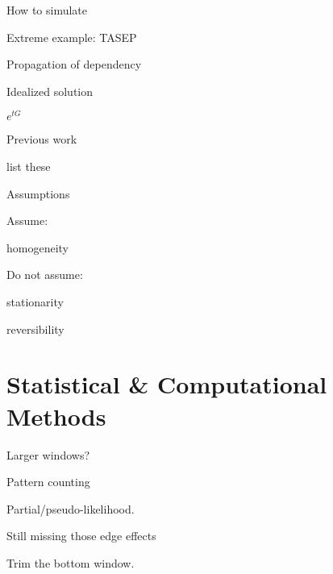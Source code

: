 \documentclass[smaller]{beamer}
\begin{document}
\begin{frame}{How to simulate}

\end{frame}

\begin{frame}{Extreme example: TASEP}



\end{frame}


\begin{frame}{Propagation of dependency}

\end{frame}


\begin{frame}{Idealized solution}

  $e^{tG}$

\end{frame}

\begin{frame}{Previous work}

  list these

\end{frame}

\begin{frame}{Assumptions}

  Assume:

    homogeneity


  Do not assume:

    stationarity

    reversibility

\end{frame}


\section{Statistical \& Computational Methods}

\begin{frame}{Larger windows?}

  Pattern counting

  Partial/pseudo-likelihood.

\end{frame}


\begin{frame}{Still missing those edge effects}

  Trim the bottom window.

\end{frame}
\end{document}
